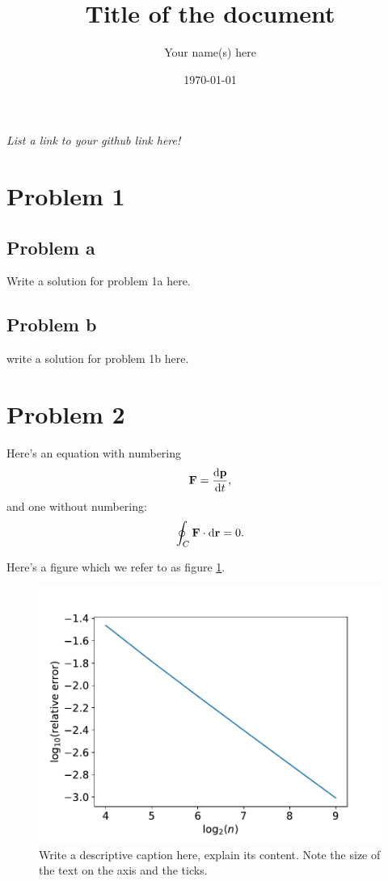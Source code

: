 \documentclass[english,notitlepage]{revtex4-1}  %
\begin{document}
\title{Title of the document}      %
\author{Your name(s) here}          %
\date{\today}                             %
\noaffiliation                            %


\maketitle 
	
\textit{List a link to your github link here!}
	
\section*{Problem 1}

\subsection*{Problem a}
Write a solution for problem 1a here.

\subsection*{Problem b}
write a solution for problem 1b here.

\section*{Problem 2}
Here's an equation with numbering
\begin{equation}
	\vb{F} = \dv{\vb{p}}{t},
\end{equation}
and one without numbering:
$$
\oint_C \vb{F}\cdot \dd \vb{r} = 0.
$$

Here's a figure which we refer to as figure \ref{fig:ref}.

\begin{figure}[h!]
	\centering %
	\includegraphics[scale=0.55]{imgs/rel_err.pdf} %
	\caption{Write a descriptive caption here, explain its content. Note the size of the text on the axis and the ticks.}
	\label{fig:ref}
\end{figure}
\end{document}
